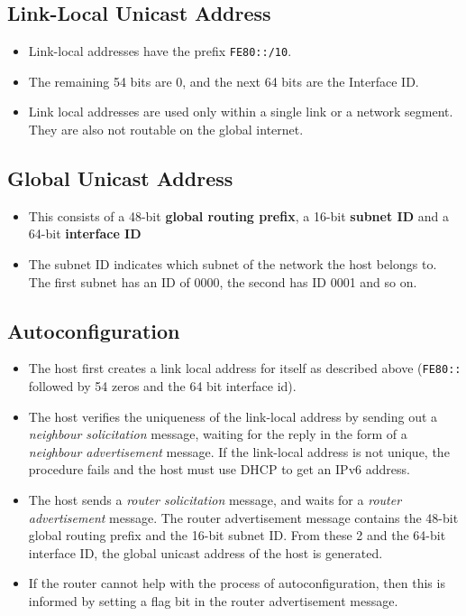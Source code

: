 \documentclass[a4paper]{article}
\theoremstyle{plain}
\theoremstyle{definition}
\begin{document}
\subsection{Link-Local Unicast Address}
\begin{itemize} 
    \item Link-local addresses have the prefix \texttt{FE80::/10}. 
    
    \item The remaining 54 bits are 0, and the next 64 bits are the Interface ID. 
    
    \item Link local addresses are used only within a single link or a network segment. They are also not routable on the global internet. 
\end{itemize}

\subsection{Global Unicast Address}
\begin{itemize}
    \item This consists of a 48-bit \textbf{global routing prefix}, a 16-bit \textbf{subnet ID} and a 64-bit \textbf{interface ID}
    
    \item The subnet ID indicates which subnet of the network the host belongs to. The first subnet has an ID of 0000, the second has ID 0001 and so on. 
\end{itemize}


\subsection{Autoconfiguration}
\begin{itemize}
    \item The host first creates a link local address for itself as described above (\texttt{FE80::} followed by 54 zeros and the 64 bit interface id).
    
    \item The host verifies the uniqueness of the link-local address by sending out a \textit{neighbour solicitation} message, waiting for the reply in the form of a\textit{ neighbour advertisement} message. If the link-local address is not unique, the procedure fails and the host must use DHCP to get an IPv6 address. 
    
    \item The host sends a \textit{router solicitation} message, and waits for a \textit{router advertisement} message. The router advertisement message contains the 48-bit global routing prefix and the 16-bit subnet ID. From these 2 and the 64-bit interface ID, the global unicast address of the host is generated. 
    
    \item If the router cannot help with the process of autoconfiguration, then this is informed by setting a flag bit in the router advertisement message. 
\end{itemize}
\end{document}
